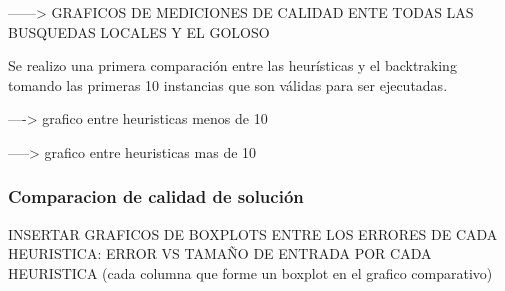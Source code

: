 ------> GRAFICOS DE MEDICIONES DE CALIDAD ENTE TODAS LAS BUSQUEDAS LOCALES Y EL GOLOSO


Se realizo una primera comparaci\'on entre las heur\'isticas y el backtraking tomando las primeras 10 instancias que son v\'alidas para ser ejecutadas.

----> grafico entre heuristicas menos de 10

-----> grafico entre heuristicas mas de 10

\subsubsection{Comparacion de calidad de solución}
INSERTAR GRAFICOS DE BOXPLOTS ENTRE LOS ERRORES DE CADA HEURISTICA:
	ERROR VS TAMAÑO DE ENTRADA POR CADA HEURISTICA (cada columna que forme un boxplot en el grafico comparativo)
	